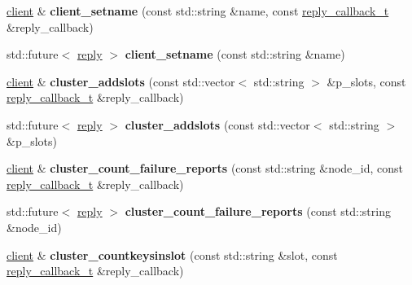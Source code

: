 \begin{DoxyCompactItemize}
\hyperlink{classcpp__redis_1_1client}{client} \& {\bfseries client\+\_\+setname} (const std\+::string \&name, const \hyperlink{classcpp__redis_1_1client_a061a1140d36d2eaeda82b09a0bb3f9f2}{reply\+\_\+callback\+\_\+t} \&reply\+\_\+callback)
\item 
\mbox{\label{classcpp__redis_1_1client_aa1ab41fda6b2536f652720b7720a0b63}} 
std\+::future$<$ \hyperlink{classcpp__redis_1_1reply}{reply} $>$ {\bfseries client\+\_\+setname} (const std\+::string \&name)
\item 
\mbox{\label{classcpp__redis_1_1client_ac156d5593e1800742188f0eee9016a84}} 
\hyperlink{classcpp__redis_1_1client}{client} \& {\bfseries cluster\+\_\+addslots} (const std\+::vector$<$ std\+::string $>$ \&p\+\_\+slots, const \hyperlink{classcpp__redis_1_1client_a061a1140d36d2eaeda82b09a0bb3f9f2}{reply\+\_\+callback\+\_\+t} \&reply\+\_\+callback)
\item 
\mbox{\label{classcpp__redis_1_1client_a0e14578c1addf1de66745a8a95e66aeb}} 
std\+::future$<$ \hyperlink{classcpp__redis_1_1reply}{reply} $>$ {\bfseries cluster\+\_\+addslots} (const std\+::vector$<$ std\+::string $>$ \&p\+\_\+slots)
\item 
\mbox{\label{classcpp__redis_1_1client_a757c2a5c8e5b42ccd3930d89d739f602}} 
\hyperlink{classcpp__redis_1_1client}{client} \& {\bfseries cluster\+\_\+count\+\_\+failure\+\_\+reports} (const std\+::string \&node\+\_\+id, const \hyperlink{classcpp__redis_1_1client_a061a1140d36d2eaeda82b09a0bb3f9f2}{reply\+\_\+callback\+\_\+t} \&reply\+\_\+callback)
\item 
\mbox{\label{classcpp__redis_1_1client_af1ff307eb9feb58b48b11bda78131a20}} 
std\+::future$<$ \hyperlink{classcpp__redis_1_1reply}{reply} $>$ {\bfseries cluster\+\_\+count\+\_\+failure\+\_\+reports} (const std\+::string \&node\+\_\+id)
\item 
\mbox{\label{classcpp__redis_1_1client_a78017860625d016074d0495c24c3f9e8}} 
\hyperlink{classcpp__redis_1_1client}{client} \& {\bfseries cluster\+\_\+countkeysinslot} (const std\+::string \&slot, const \hyperlink{classcpp__redis_1_1client_a061a1140d36d2eaeda82b09a0bb3f9f2}{reply\+\_\+callback\+\_\+t} \&reply\+\_\+callback)

\end{DoxyCompactItemize}
